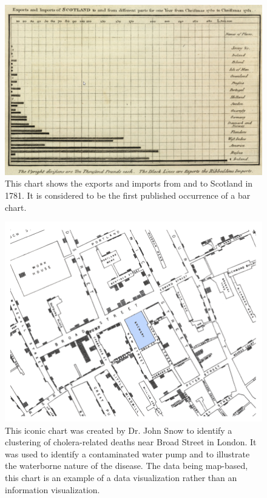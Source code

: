 \begin{figure}[tp]
    \centering
    \includegraphics[keepaspectratio,width=\linewidth,height=\fullh / 3]
    {images/playfair-bar-chart.png}
    \caption[Chart of 1781 Exports and Imports of Scotland From 1786]{
        This chart shows the exports and imports from and to Scotland in 1781. It is considered to be the first published occurrence of a bar chart. 
    }
    \label{fig:PlayfairBarChart}
\end{figure}

\begin{figure}[tp]
    \centering
    \includegraphics[keepaspectratio,width=\linewidth,height=\fullh / 3]
    {images/cholera-dot-map.png}
    \caption[Dot Map Plotting Cholera Deaths in London From 1855]{
        This iconic chart was created by Dr. John Snow to identify a clustering of cholera-related deaths near Broad Street in London. It was used to identify a contaminated water pump and to illustrate the waterborne nature of the disease. The data being map-based, this chart is an example of a data visualization rather than an information visualization. 
    }
    \label{fig:CholeraDotMap}
\end{figure}

